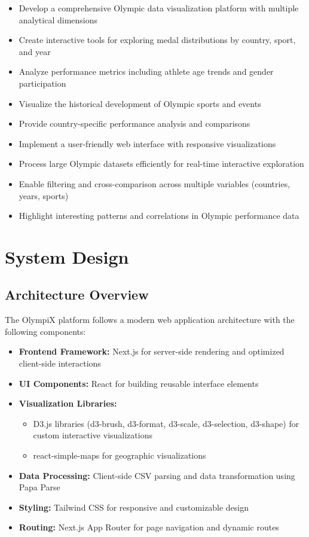 \documentclass[a4paper, 12pt]{article}
\begin{document}
\begin{itemize}[leftmargin=*]
    \item Develop a comprehensive Olympic data visualization platform with multiple analytical dimensions
    \item Create interactive tools for exploring medal distributions by country, sport, and year
    \item Analyze performance metrics including athlete age trends and gender participation
    \item Visualize the historical development of Olympic sports and events
    \item Provide country-specific performance analysis and comparisons
    \item Implement a user-friendly web interface with responsive visualizations
    \item Process large Olympic datasets efficiently for real-time interactive exploration
    \item Enable filtering and cross-comparison across multiple variables (countries, years, sports)
    \item Highlight interesting patterns and correlations in Olympic performance data
\end{itemize}

\section{System Design}
\subsection{Architecture Overview}
The OlympiX platform follows a modern web application architecture with the following components:

\begin{itemize}[leftmargin=*]
    \item \textbf{Frontend Framework:} Next.js for server-side rendering and optimized client-side interactions
    \item \textbf{UI Components:} React for building reusable interface elements
    \item \textbf{Visualization Libraries:} 
        \begin{itemize}
            \item D3.js libraries (d3-brush, d3-format, d3-scale, d3-selection, d3-shape) for custom interactive visualizations
            \item react-simple-maps for geographic visualizations
        \end{itemize}
    \item \textbf{Data Processing:} Client-side CSV parsing and data transformation using Papa Parse
    \item \textbf{Styling:} Tailwind CSS for responsive and customizable design
    \item \textbf{Routing:} Next.js App Router for page navigation and dynamic routes
\end{itemize}
\end{document}
